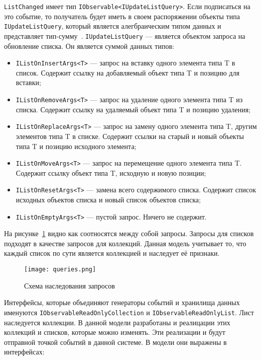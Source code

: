 \lstinline[style=csharpinlinestyle]!ListChanged! имеет тип \lstinline[style=csharpinlinestyle]!IObservable<IUpdateListQuery>!.
Если подписаться на это событие, то получатель будет иметь в своем распоряжении объекты типа \lstinline[style=csharpinlinestyle]!IUpdateListQuery!,
который является алегбраическим типом данных и представляет тип-сумму~\cite{algebraic_data_type}.
\lstinline[style=csharpinlinestyle]!IUpdateListQuery! --- является объектом запроса на обновление списка.
Он является суммой данных типов:

\begin{itemize}
  \item \lstinline[style=csharpinlinestyle]!IListOnInsertArgs<T>! --- запрос на вставку одного элемента типа T в список. Содержит ссылку на добавляемый объект типа T и позицию для вставки;
  \item \lstinline[style=csharpinlinestyle]!IListOnRemoveArgs<T>! --- запрос на удаление одного элемента типа T из списка. Содержит ссылку на удаляемый объект типа T и позицию удаления;
  \item \lstinline[style=csharpinlinestyle]!IListOnReplaceArgs<T>! --- запрос на замену одного элемента типа T, другим элементов типа T в списке.
  Содержит ссылки на старый и новый объекты типа T и позицию исходного элемента;
  \item \lstinline[style=csharpinlinestyle]!IListOnMoveArgs<T>! --- запрос на перемещение одного элемента типа T. Содержит ссылку объект типа T, исходную и новую позиции;
  \item \lstinline[style=csharpinlinestyle]!IListOnResetArgs<T>! --- замена всего содержимого списка. Содержит список исходных объектов списка и новый список объектов списка;
  \item \lstinline[style=csharpinlinestyle]!IListOnEmptyArgs<T>! --- пустой запрос. Ничего не содержит.
\end{itemize}

На рисунке~\ref{fig:queries} видно как соотносятся между собой запросы. Запросы для списков подходят в качестве запросов для коллекций.
Данная модель учитывает то, что каждый список по сути является коллекцией и наследует её признаки.

\begin{figure}[ht]
\centering
  \texttt{[image: queries.png]}
  \caption{ Схема наследования запросов }
  \label{fig:queries}
\end{figure}

Интерфейсы, которые объединяют генераторы событий и хранилища данных именуются \lstinline[style=csharpinlinestyle]!IObservableReadOnlyCollection! и \lstinline[style=csharpinlinestyle]!IObservableReadOnlyList!.
Лист наследуется коллекции. В данной модели разработаны и реалицации этих коллекций и списков, которые можно изменять. Эти реализации и будут отправной точкой событий в данной системе.
В модели они выражены в интерфейсах:

